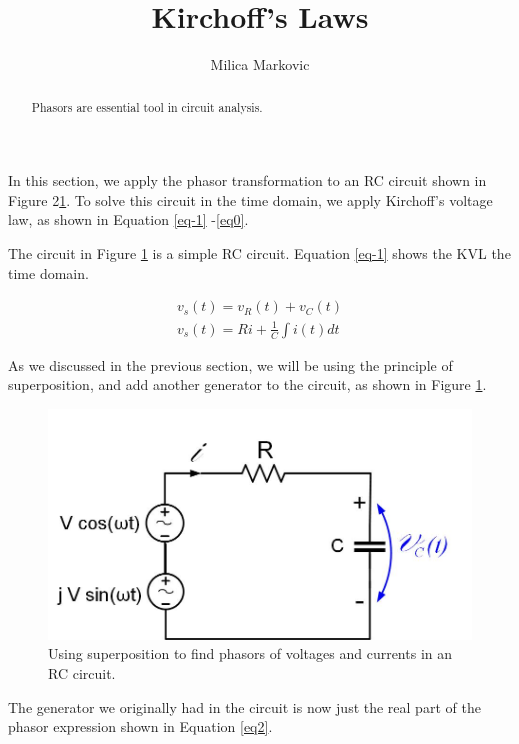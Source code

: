 \documentclass{ximera}
\title{Kirchoff's Laws}
\author{Milica Markovic}
\begin{document}
  
\begin{abstract}  
Phasors are essential tool in circuit analysis.
\end{abstract}  
\maketitle    



In this section, we apply the phasor transformation to an RC circuit shown in Figure 2\ref{RCcirc}.  To solve this circuit in the time domain, we apply Kirchoff's voltage law, as shown in Equation \ref{eq-1} -\ref{eq0}.


The circuit in Figure \ref{RCcirc} is a simple RC circuit.  Equation \ref{eq-1} shows the KVL the time domain.

\begin{eqnarray}
        v_s(t)=v_R(t)+v_C(t)                \label{eq-1}  \\
v_s(t) = R i + \frac{1}{C} \int i(t) dt \label{eq0}
\end{eqnarray} 


As we discussed in the previous section, we will be using the principle of superposition, and add another generator to the circuit, as shown in Figure \ref{RCcirc}.

\begin{figure}[htbp]
\begin{center}
\includegraphics[scale=0.5]{../jpg/RCcircuitPhasorSup.jpg}
\end{center}
\caption{Using superposition to find phasors of voltages and currents in an RC circuit.}
\label{RCcirc}
\end{figure}

The generator we originally had in the circuit is now just the real part of the phasor expression shown in Equation \ref{eq2}.
\end{document}
